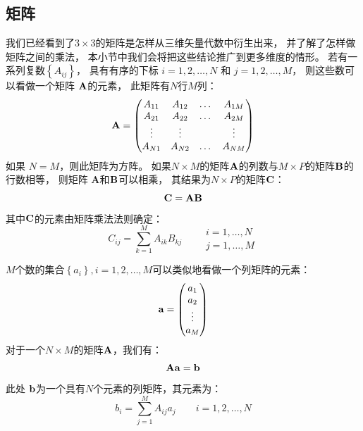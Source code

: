 \subsection{矩阵}
\label{sec:1.1.2}
我们已经看到了$3\times 3$的矩阵是怎样从三维矢量代数中衍生出来，
并了解了怎样做矩阵之间的乘法，
本小节中我们会将把这些结论推广到更多维度的情形。
若有一系列复数$\left\{A_{ij}\right\}$，
具有有序的下标 $i = 1, 2, \dots, N$ 和 $j = 1, 2, \dots, M$，
则这些数可以看做一个矩阵 $\mathbf A$的元素，
此矩阵有$N$行$M$列：
\begin{equation}
 \mbf{A} = 
 \begin{pmatrix*}[c]
     A_{11} &A_{12} &\dots &A_{1M} \\
     A_{21} &A_{22} &\dots &A_{2M} \\
     \vdots &\vdots &               &\vdots \\
     A_{N1} &A_{N2} &\dots &A_{NM}
 \end{pmatrix*}
 \label{eq:1.20}
\end{equation}
如果 $N=M$，则此矩阵为方阵。
如果$N\times M$的矩阵$\mathbf A$的列数与$M\times P$的矩阵$\mathbf B$的行数相等，
则矩阵 $\mathbf{A}$和$\mathbf B$可以相乘，
其结果为$N\times P$的矩阵$\mathbf C$：
\begin{equation}
 \mathbf{C} = \mathbf{A}\mathbf{B}
 \label{eq:1.21}
\end{equation}
其中$\mathbf C$的元素由矩阵乘法法则确定：
\begin{equation}
 C_{ij} = \sum_{k=1}^M A_{ik}B_{kj}\qquad 
 \begin{array}{c}
     i = 1, \dots, N \\
     j = 1, \dots, M
 \end{array}
 \label{eq:1.22}
\end{equation}

$M$个数的集合$\left\{a_i\right\}, i = 1, 2, \dots, M$可以类似地看做一个列矩阵的元素：
\begin{equation}
 \mbf a = 
 \begin{pmatrix*}[c]
     a_1 \\ a_2 \\ \vdots \\ a_M
 \end{pmatrix*}
 \label{eq:1.23}
\end{equation}
对于一个$N\times M$的矩阵$\mathbf A$，我们有：
\begin{equation}
 \mathbf A \mathbf a = \mathbf b
 \label{eq:1.24}
\end{equation}
此处 $\mathbf b$为一个具有$N$个元素的列矩阵，其元素为：
\begin{equation}
 b_i = \sum_{j=1}^M A_{ij}a_j \qquad i = 1, 2, \dots, N
 \label{eq:1.25}
\end{equation}

